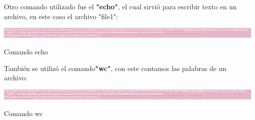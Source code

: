 \documentclass{article}
\begin{document}
Otro comando utilizado fue el \textbf{"echo"}, el cual sirvió para escribir texto en un archivo, en este caso el archivo "file1":

\begin{center}
 \includegraphics[width=1\textwidth]{echo.png}

Comando echo

\end{center}

También se utilizó el comando\textbf{"wc"}, con este contamos las palabras de un archivo:
\begin{center}
 \includegraphics[width=1\textwidth]{wc.png}

Comando wc

\end{center}
\end{document}
